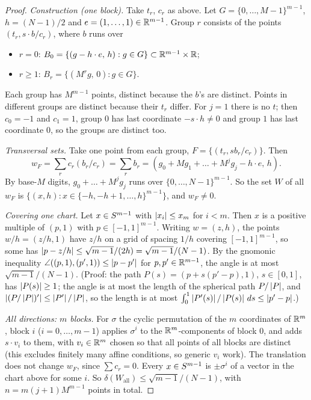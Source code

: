 \documentclass[11pt]{article}
\begin{document}
\begin{proof}
\emph{Construction (one block).} Take $t_r$, $c_r$ as above. Let $G=\{0,\dots,M-1\}^{m-1}$, $h=(N-1)/2$ and $e=(1,\dots,1)\in\mathbb{R}^{m-1}$. Group
$r$ consists of the points $(t_r,s\cdot b/c_r)$, where $b$ runs over
\begin{itemize}
  \item $r=0$: $B_0=\{(g-h\cdot e,\,h):g\in G\}\subset\mathbb{R}^{m-1}\times\mathbb{R}$;
  \item $r\ge1$: $B_r=\{(M^rg,\,0):g\in G\}$.
\end{itemize}
Each group has $M^{m-1}$ points, distinct because the $b$'s are distinct. Points in different groups are distinct
because their $t_r$ differ. For $j=1$ there is no $t$; then $c_0=-1$ and $c_1=1$, group $0$ has last
coordinate $-s\cdot h\ne0$ and group $1$ has last coordinate $0$, so the groups are distinct too.

\emph{Transversal sets.} Take one point from each group, $F=\{(t_r,sb_r/c_r)\}$. Then
\[
  w_F=\sum_rc_r(b_r/c_r)=\sum_rb_r=(g_0+Mg_1+\dots+M^jg_j-h\cdot e,\,h).
\]
By base-$M$ digits, $g_0+\dots+M^jg_j$ runs over $\{0,\dots,N-1\}^{m-1}$. So the set $W$ of all
$w_F$ is $\{(x,h):x\in\{-h,-h+1,\dots,h\}^{m-1}\}$, and $w_F\ne0$.

\emph{Covering one chart.} Let $x\in S^{m-1}$ with $\left|x_i\right|\le x_m$ for $i<m$. Then $x$ is a
positive multiple of $(p,1)$ with $p\in[-1,1]^{m-1}$. Writing $w=(z,h)$, the points
$w/h=(z/h,1)$ have $z/h$ on a grid of spacing $1/h$ covering $[-1,1]^{m-1}$, so some has
$\left|p-z/h\right|\le\sqrt{m-1}/(2h)=\sqrt{m-1}/(N-1)$. By the gnomonic inequality
$\angle((p,1),(p',1))\le\left|p-p'\right|$ for $p,p'\in\mathbb{R}^{m-1}$, the angle is at most $\sqrt{m-1}/(N-1)$.
(Proof: the path $P(s)=(p+s(p'-p),1)$, $s\in[0,1]$, has $\left|P(s)\right|\ge1$; the angle is at most the
length of the spherical path $P/\left|P\right|$, and $\left|(P/\left|P\right|)'\right|\le\left|P'\right|/\left|P\right|$, so the length is at
most $\int_0^1\left|P'(s)\right|/\left|P(s)\right|\,ds\le\left|p'-p\right|$.)

\emph{All directions: $m$ blocks.} For $\sigma$ the cyclic permutation of the $m$ coordinates of
$\mathbb{R}^m$, block $i$ ($i=0,\dots,m-1$) applies $\sigma^i$ to the $\mathbb{R}^m$-components of block $0$, and
adds $s\cdot v_i$ to them, with $v_i\in\mathbb{R}^m$ chosen so that all points of all blocks are distinct
(this excludes finitely many affine conditions, so generic $v_i$ work). The translation does not
change $w_F$, since $\sum c_r=0$. Every $x\in S^{m-1}$ is $\pm\sigma^i$ of a vector in the chart
above for some $i$. So $\delta(W_{\mathrm{all}})\le\sqrt{m-1}/(N-1)$, with $n=m(j+1)M^{m-1}$ points
in total.


\end{proof}
\end{document}
